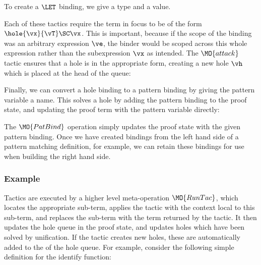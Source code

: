\noindent
To create a $\LET$ binding, we give a type and a value.


Each of these tactics require the term in focus to be of the form $\hole{\vx}{\vT}\SC\vx$.
This is important, because if the scope of the binding was an arbitrary expression $\ve$,
the binder would be scoped across this whole expression rather than the subexpression
$\vx$ as intended.
The $\MO{attack}$ tactic ensures that a hole
is in the appropriate form, creating a new hole $\vh$ which is placed at the head
of the queue:


Finally, we can convert a hole binding to a pattern binding by giving the 
pattern variable a name. This solves a hole
by adding the pattern binding to the proof state, and updating the proof term
with the pattern variable directly:


The $\MO{PatBind}$ operation simply updates the proof state with the given pattern
binding. Once we have created bindings from the left hand side of a pattern
matching definition, for example, we can retain these bindings for use when
building the right hand side.

\subsubsection{Example}

Tactics are executed by a higher level meta-operation $\MO{RunTac}$, which
locates the appropriate sub-term, applies the tactic with the context
local to this sub-term, and
replaces the sub-term with the term returned by the
tactic. It then updates the hole queue in the proof state, and updates holes which have
been solved by unification. If the tactic creates new holes, these are automatically
added to the  of the hole queue.
For example, consider the following simple
\TT{} definition for the identify function:

